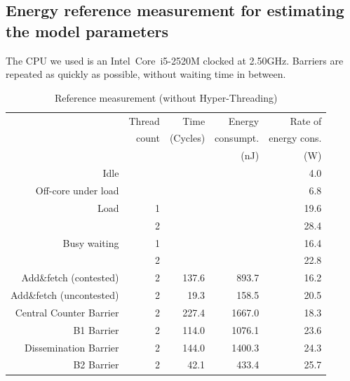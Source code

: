 \documentclass[a4paper, 10pt]{article}
\begin{document}
\subsection{Energy reference measurement for estimating the model parameters}
The CPU we used is an Intel\textregistered~Core\texttrademark~i5-2520M clocked at 2.50GHz.
Barriers are repeated as quickly as possible, without waiting time in between.
\label{ssec:energy-measurement}
\begin{table}[htbp]
	\centering
	\caption{Reference measurement (without Hyper-Threading)}
	\vspace{0.2cm}
	\begin{tabular}{r | r | r r r}
		                         & Thread & Time     & Energy    & Rate of      \\
		                         & count  & (Cycles) & consumpt. & energy cons. \\
		                         &        &          & (nJ)      & (W)          \\
		\hline
		Idle                     &        &          &           &  4.0 \\
		Off-core under load      &        &          &           &  6.8 \\
		Load                     & 1      &          &           & 19.6 \\
		                         & 2      &          &           & 28.4 \\
		Busy waiting             & 1      &          &           & 16.4 \\
		                         & 2      &          &           & 22.8 \\
		\hline
		Add\&fetch (contested)   & 2      &    137.6 &     893.7 & 16.2 \\
		Add\&fetch (uncontested) & 2      &     19.3 &     158.5 & 20.5 \\
		Central Counter Barrier  & 2      &    227.4 &    1667.0 & 18.3 \\
		B1 Barrier               & 2      &    114.0 &    1076.1 & 23.6 \\
		Dissemination Barrier    & 2      &    144.0 &    1400.3 & 24.3 \\
		B2 Barrier               & 2      &     42.1 &     433.4 & 25.7 \\
	\end{tabular}
\end{table}
\end{document}
